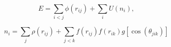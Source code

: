 \documentclass[12pt]{article}
\begin{document}
$$
   E=\sum_{i<j}\phi(r_{ij})+\sum_{i}U(n_{i}),
$$

$$
   n_{i}=\sum_{j}\rho(r_{ij})+\sum_{j<k}f(r_{ij})f(r_{ik})g[\cos(\theta_{jik})]
$$
\end{document}
